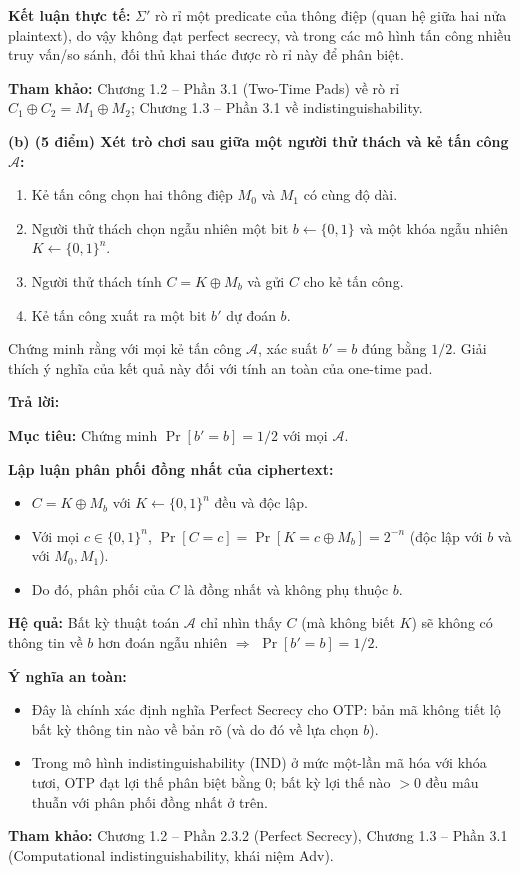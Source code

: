 \textbf{Kết luận thực tế:} $\Sigma'$ rò rỉ một predicate của thông điệp (quan hệ giữa hai nửa plaintext), do vậy không đạt perfect secrecy, và trong các mô hình tấn công nhiều truy vấn/so sánh, đối thủ khai thác được rò rỉ này để phân biệt.

\textbf{Tham khảo:} Chương 1.2 – Phần 3.1 (Two-Time Pads) về rò rỉ $C_1 \oplus C_2 = M_1 \oplus M_2$; Chương 1.3 – Phần 3.1 về indistinguishability.

\textbf{(b) (5 điểm) Xét trò chơi sau giữa một người thử thách và kẻ tấn công $\mathcal{A}$:}

\begin{enumerate}
    \item Kẻ tấn công chọn hai thông điệp $M_0$ và $M_1$ có cùng độ dài.
    \item Người thử thách chọn ngẫu nhiên một bit $b \leftarrow \{0,1\}$ và một khóa ngẫu nhiên $K \leftarrow \{0,1\}^n$.
    \item Người thử thách tính $C = K \oplus M_b$ và gửi $C$ cho kẻ tấn công.
    \item Kẻ tấn công xuất ra một bit $b'$ dự đoán $b$.
\end{enumerate}

Chứng minh rằng với mọi kẻ tấn công $\mathcal{A}$, xác suất $b' = b$ đúng bằng $1/2$. Giải thích ý nghĩa của kết quả này đối với tính an toàn của one-time pad.

\begin{center}
\textbf{Trả lời:}
\end{center}

\textbf{Mục tiêu:} Chứng minh $\Pr[b' = b] = 1/2$ với mọi $\mathcal{A}$.

\textbf{Lập luận phân phối đồng nhất của ciphertext:}
\begin{itemize}
    \item $C = K \oplus M_b$ với $K \leftarrow \{0,1\}^n$ đều và độc lập.
    \item Với mọi $c \in \{0,1\}^n$, $\Pr[C = c] = \Pr[K = c \oplus M_b] = 2^{-n}$ (độc lập với $b$ và với $M_0, M_1$).
    \item Do đó, phân phối của $C$ là đồng nhất và không phụ thuộc $b$.
\end{itemize}

\textbf{Hệ quả:} Bất kỳ thuật toán $\mathcal{A}$ chỉ nhìn thấy $C$ (mà không biết $K$) sẽ không có thông tin về $b$ hơn đoán ngẫu nhiên $\Rightarrow$ $\Pr[b' = b] = 1/2$.

\textbf{Ý nghĩa an toàn:}
\begin{itemize}
    \item Đây là chính xác định nghĩa Perfect Secrecy cho OTP: bản mã không tiết lộ bất kỳ thông tin nào về bản rõ (và do đó về lựa chọn $b$).
    \item Trong mô hình indistinguishability (IND) ở mức một-lần mã hóa với khóa tươi, OTP đạt lợi thế phân biệt bằng 0; bất kỳ lợi thế nào $> 0$ đều mâu thuẫn với phân phối đồng nhất ở trên.
\end{itemize}

\textbf{Tham khảo:} Chương 1.2 – Phần 2.3.2 (Perfect Secrecy), Chương 1.3 – Phần 3.1 (Computational indistinguishability, khái niệm Adv).